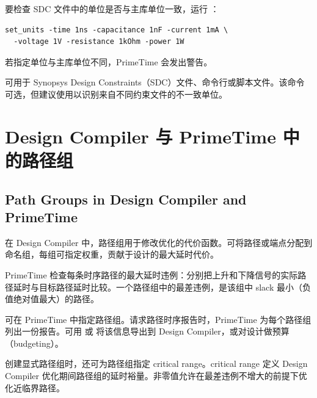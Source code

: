 要检查 SDC 文件中的单位是否与主库单位一致，运行 ：
\begin{lstlisting}
set_units -time 1ns -capacitance 1nF -current 1mA \
  -voltage 1V -resistance 1kOhm -power 1W
\end{lstlisting}

若指定单位与主库单位不同，PrimeTime 会发出警告。

 可用于 Synopsys Design Constraints（SDC）文件、命令行或脚本文件。该命令可选，但建议使用以识别来自不同约束文件的不一致单位。

\section{Design Compiler 与 PrimeTime 中的路径组}
\subsection*{Path Groups in Design Compiler and PrimeTime}

在 Design Compiler 中，路径组用于修改优化的代价函数。可将路径或端点分配到命名组，每组可指定权重，贡献于设计的最大延时代价。

PrimeTime 检查每条时序路径的最大延时违例：分别把上升和下降信号的实际路径延时与目标路径延时比较。一个路径组中的最差违例，是该组中 slack 最小（负值绝对值最大）的路径。

可在 PrimeTime 中指定路径组。请求路径时序报告时，PrimeTime 为每个路径组列出一份报告。可用  或  将该信息导出到 Design Compiler，或对设计做预算（budgeting）。

创建显式路径组时，还可为路径组指定 critical range。critical range 定义 Design Compiler 优化期间路径组的延时裕量。非零值允许在最差违例不增大的前提下优化近临界路径。
